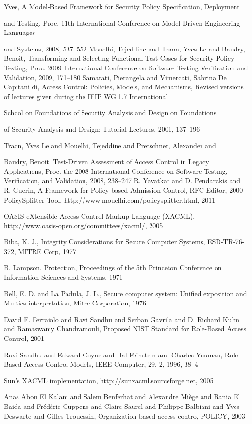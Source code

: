\documentclass{acm_proc_article-sp}
\begin{document}
\begin{thebibliography}{1}
	Yves,
A Model-Based Framework for Security Policy Specification, Deployment

	and Testing,
Proc. 11th International Conference on Model Driven Engineering Languages

	and Systems,
2008,
537--552
Mouelhi, Tejeddine and Traon, Yves Le and Baudry, Benoit,
Transforming and Selecting Functional Test Cases for Security Policy
	Testing,
Proc. 2009 International Conference on Software Testing Verification
	and Validation,
2009,
171--180
Samarati, Pierangela and Vimercati, Sabrina De Capitani di,
Access Control: Policies, Models, and Mechanisms,
Revised versions of lectures given during the IFIP WG 1.7 International

	School on Foundations of Security Analysis and Design on Foundations

	of Security Analysis and Design: Tutorial Lectures,
2001,
137--196

Traon, Yves Le and Mouelhi, Tejeddine and Pretschner, Alexander and

	Baudry, Benoit,
Test-Driven Assessment of Access Control in Legacy Applications,
Proc. the 2008 International Conference on Software Testing, Verification,
	and Validation,
2008,
238--247
R. Yavatkar and D. Pendarakis and R. Guerin,
A Framework for Policy-based Admission Control,
RFC Editor,
2000
PolicySplitter Tool,
http://www.mouelhi.com/policysplitter.html,
2011

OASIS eXtensible Access Control Markup Language (XACML),
http://www.oasis-open.org/committees/xacml/,
2005

Biba, K. J.,
Integrity Considerations for Secure Computer Systems,
ESD-TR-76-372,
MITRE Corp,
1977

B. Lampson,
Protection,
Proceedings of the 5th Princeton Conference on Information Sciences and Systems, 
1971

Bell, E. D. and La Padula, J. L.,
Secure computer system: Unified exposition and Multics interpretation,
Mitre Corporation,
1976

David F. Ferraiolo and Ravi Sandhu and Serban Gavrila and D. Richard Kuhn and Ramaswamy Chandramouli,
Proposed NIST Standard for Role-Based Access Control,
2001

Ravi Sandhu and Edward Coyne and Hal Feinstein and Charles Youman,
Role-Based Access Control Models,
IEEE Computer,
29,
2,  
1996,
38--4

 Sun's XACML implementation,
http://sunxacml.sourceforge.net,
2005

Anas Abou El Kalam and
               Salem Benferhat and
               Alexandre Mi{\`e}ge and
               Rania El Baida and
               Fr{\'e}d{\'e}ric Cuppens and
               Claire Saurel and
               Philippe Balbiani and
               Yves Deswarte and
               Gilles Trouessin,
Organization based access contro,
POLICY,
2003


\end{thebibliography}
%
% 
\end{document}
